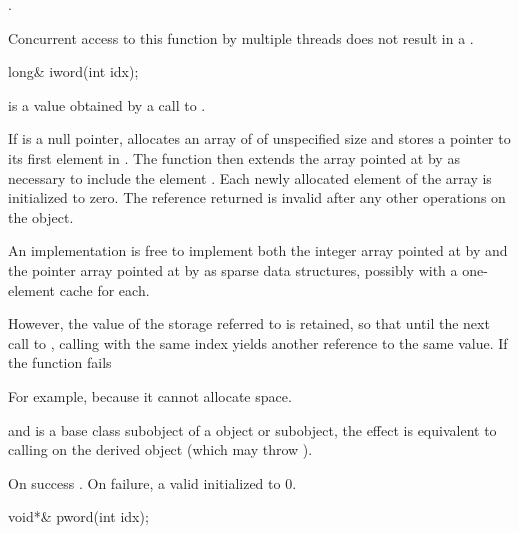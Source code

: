 \begin{itemdescr}
\pnum
\returns
{}
\tcode{++}.

\pnum
\remarks
Concurrent access to this function by multiple threads does not result in a
.
\end{itemdescr}

%
\begin{itemdecl}
long& iword(int idx);
\end{itemdecl}

\begin{itemdescr}
\pnum
\expects
{} is a value obtained by a call to .

\pnum
\effects
If  is a null pointer, allocates an array of
of unspecified size and stores a pointer to its first element in
.
The function then extends the array pointed at by
 as necessary to include the element
.
Each newly allocated element of the array is initialized to zero.
The reference returned is invalid after any other operations on the
object.
\begin{footnote}
An implementation is free to implement both the integer
array pointed at by  and the pointer array pointed at by
 as sparse data structures, possibly with a one-element
cache for each.
\end{footnote}
However, the value of the storage referred to is retained, so
that until the next call to
,
calling
with the same index yields another reference to the same value.
If the function fails
\begin{footnote}
For example, because it cannot allocate space.
\end{footnote}
and
is a base class subobject of a
object or subobject, the effect is equivalent to calling
on the derived object (which may throw
).

\pnum
\returns
On success
.
On failure, a valid
initialized to 0.
\end{itemdescr}

%
\begin{itemdecl}
void*& pword(int idx);
\end{itemdecl}

